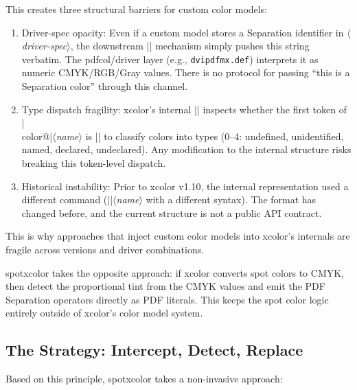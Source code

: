 \documentclass[luatex]{article}
\newcommand\pkg[1]{\textsf{#1}}
\providecommand\meta[1]{\ensuremath{\langle}\textit{#1}\ensuremath{\rangle}}
\begin{document}
This creates three structural barriers for custom color models:
\begin{enumerate}
\item Driver-spec opacity:
  Even if a custom model stores a Separation identifier in \meta{driver-spec},
  the downstream |\set@color| mechanism simply pushes this string verbatim.
  The \pkg{pdfcol}/driver layer (e.g., \texttt{dvipdfmx.def}) interprets it
  as numeric CMYK/RGB/Gray values.
  There is no protocol for passing ``this is a Separation color'' through this channel.

\item Type dispatch fragility:
  \pkg{xcolor}'s internal |\XC@type| inspects whether the first token of |\\color@|\meta{name}
  is |\xcolor@| to classify colors into types (0--4: undefined, unidentified, named, declared, undeclared).
  Any modification to the internal structure risks breaking this token-level dispatch.

\item Historical instability:
  Prior to \pkg{xcolor} v1.10, the internal representation used a different command
  (|\xcolor@|\meta{name} with a different syntax).
  The format has changed before, and the current structure is not a public API contract.
\end{enumerate}

\noindent
This is why approaches that inject custom color models into \pkg{xcolor}'s internals
are fragile across versions and driver combinations.

\pkg{spotxcolor} takes the opposite approach:
if \pkg{xcolor} converts spot colors to CMYK,
then detect the proportional tint from the CMYK values
and emit the PDF Separation operators directly as PDF literals.
This keeps the spot color logic entirely outside of \pkg{xcolor}'s color model system.

\subsection{The Strategy: Intercept, Detect, Replace}

Based on this principle, \pkg{spotxcolor} takes a non-invasive approach:
\end{document}

